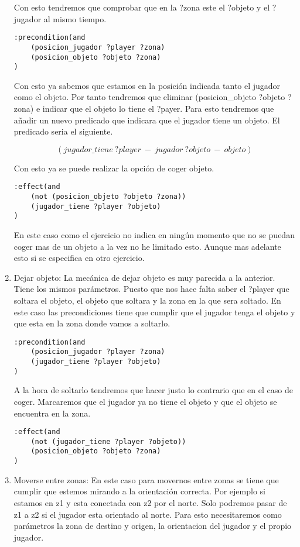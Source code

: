 \documentclass[]{article}
\begin{document}
\begin{enumerate}
Con esto tendremos que comprobar que en la ?zona este el ?objeto y el ?jugador al mismo tiempo.
\begin{lstlisting}
:precondition(and
	(posicion_jugador ?player ?zona)
	(posicion_objeto ?objeto ?zona)
)
\end{lstlisting}

Con esto ya sabemos que estamos en la posición indicada tanto el jugador como el objeto. Por tanto tendremos que eliminar (posicion\_objeto ?objeto ?zona) e indicar que el objeto lo tiene el ?payer. Para esto tendremos que añadir un nuevo predicado que indicara que el jugador tiene un objeto. El predicado seria el siguiente.

$$
(jugador\_tiene\ ?player\ -\ jugador\ ?objeto\ -\ objeto)
$$

Con esto ya se puede realizar la opción de coger objeto.
\begin{lstlisting}
:effect(and 
	(not (posicion_objeto ?objeto ?zona))
	(jugador_tiene ?player ?objeto)
)
\end{lstlisting}

En este caso como el ejercicio no indica en ningún momento que no se puedan coger mas de un objeto a la vez no he limitado esto. Aunque mas adelante esto si se especifica en otro ejercicio.

\item{Dejar objeto:} La mecánica de dejar objeto es muy parecida a la anterior. Tiene los mismos parámetros. Puesto que nos hace falta saber el ?player que soltara el objeto, el objeto que soltara y la zona en la que sera soltado.
En este caso las precondiciones tiene que cumplir que el jugador tenga el objeto y que esta en la zona donde vamos a soltarlo.

\begin{lstlisting}
:precondition(and
	(posicion_jugador ?player ?zona)
	(jugador_tiene ?player ?objeto)
)
\end{lstlisting}

A la hora de soltarlo tendremos que hacer justo lo contrario que en el caso de coger. Marcaremos que el jugador ya no tiene el objeto y que el objeto se encuentra en la zona.

\begin{lstlisting}
:effect(and 
	(not (jugador_tiene ?player ?objeto))
	(posicion_objeto ?objeto ?zona)
)
\end{lstlisting}

\item{Moverse entre zonas:} En este caso para movernos entre zonas se tiene que cumplir que estemos mirando a la orientación correcta. Por ejemplo si estamos en z1 y esta conectada con z2 por el norte. Solo podremos pasar de z1 a z2 si el jugador esta orientado al norte. 
Para esto necesitaremos como parámetros la zona de destino y origen, la orientacion del jugador y el propio jugador.


\end{enumerate}
\end{document}
